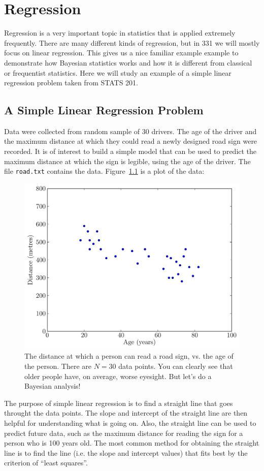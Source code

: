 \chapter{Regression}
Regression is a very important topic in statistics that is applied extremely
frequently. There are many different kinds of regression, but in 331 we will
mostly focus on linear regression. This gives us a nice familiar example
example to demonstrate how Bayesian statistics works and how it is different
from classical or frequentist statistics. Here we will study an example of a
simple linear regression problem taken from STATS 201.

\section{A Simple Linear Regression Problem}
Data were collected from random sample of 30 drivers. The age of the driver and the 
maximum distance at which they could read a newly designed road sign were 
recorded. It is of interest to build a simple model that can be used to predict the 
maximum distance at which the sign is legible, using the age of the driver. The file 
{\tt road.txt} contains the data. Figure~\ref{fig:road} is a plot of the data:
\begin{figure}
\begin{center}
\includegraphics[scale=0.5]{Figures/road.pdf}
\caption{The distance at which a person can read a road sign, vs. the age of
the person. There are $N=30$ data points. You can clearly see that older people
have, on average, worse eyesight. But let's do a Bayesian analysis!\label{fig:road}}
\end{center}
\end{figure}
The purpose of simple linear regression is to find a straight line that goes
throught the data points. The slope and intercept of the straight line are then
helpful for understanding what is going on. Also, the straight line can be used
to predict future data, such as the maximum distance for reading the sign for a
person who is 100 years old. The most common method for obtaining the straight
line is to find the line (i.e. the slope and intercept values) that fits best
by the criterion of ``least squares''.

